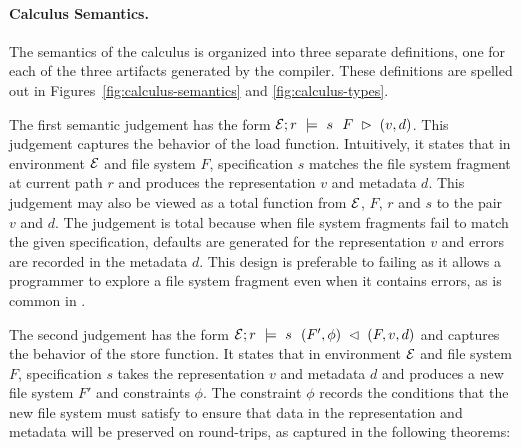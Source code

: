 \paragraph*{Calculus Semantics.}
%
The semantics of the calculus is organized into three separate
definitions, one for each of the three artifacts generated by the
\forest{} compiler. These definitions are spelled out in
Figures~\ref{fig:calculus-semantics} and \ref{fig:calculus-types}.

The first semantic judgement has the form $\load{\Env}{F}{r}{s}{v,d}$.
This judgement captures the behavior of the load function.
Intuitively, it states that in environment $\Env$ and file system $F$,
specification $s$ matches the file system fragment at current path $r$
and produces the representation $v$ and metadata $d$.  This judgement
may also be viewed as a total function from $\Env$, $F$, $r$ and $s$
to the pair $v$ and $d$.  The judgement is total because when file
system fragments fail to match the given specification, defaults are
generated for the representation $v$ and errors are recorded in the
metadata $d$.  This design is preferable to failing as it allows a
programmer to explore a file system fragment even when it contains
errors, as is common in \filestores{}.

The second judgement has the form
$\store{\Env}{F}{r}{v,d}{s}{F',\phi}$ and captures the behavior of the
store function.  It states that in environment $\Env$ and file system
$F$, specification $s$ takes the representation $v$ and metadata $d$
and produces a new file system $F'$ and constraints $\phi$. The
constraint $\phi$ records the conditions that the new file system must
satisfy to ensure that data in the representation and metadata will be
preserved on round-trips, as captured in the following theorems:
%

